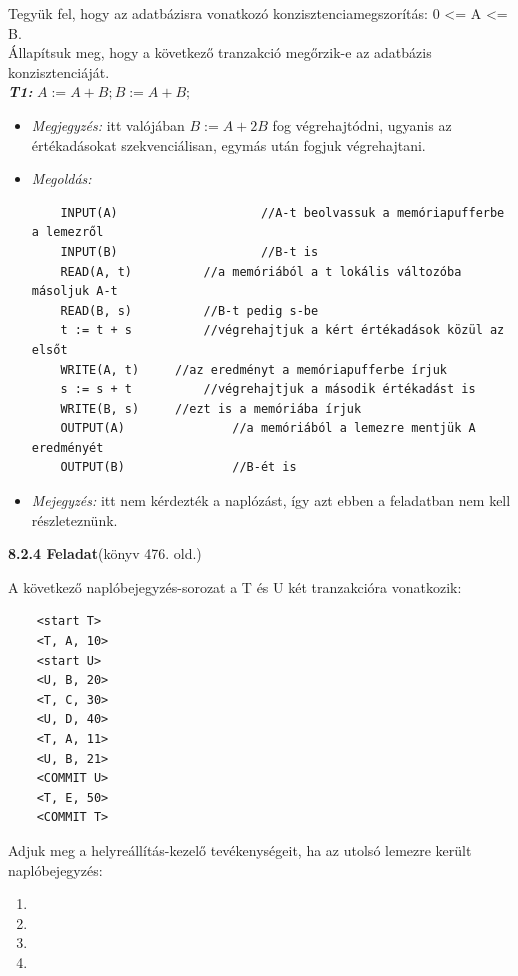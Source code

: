 \documentclass[a4paper,11.5pt, table]{article}
\begin{document}
	Tegyük fel, hogy az adatbázisra vonatkozó konzisztenciamegszorítás: 0 <= A <= B. \\
	Állapítsuk meg, hogy a következő tranzakció megőrzik-e az adatbázis konzisztenciáját.\\
	\textbf{\textit{T1:}} $ A := A + B; B := A + B;$
	\begin{itemize}
		\item \textit{Megjegyzés:} itt valójában $B := A + 2B$ fog végrehajtódni, ugyanis az értékadásokat szekvenciálisan, egymás után fogjuk végrehajtani. 
		
		\item \textit{Megoldás:}\\
		\begin{lstlisting}
	INPUT(A)					//A-t beolvassuk a memóriapufferbe a lemezről
	INPUT(B)					//B-t is
	READ(A, t)			//a memóriából a t lokális változóba másoljuk A-t
	READ(B, s)			//B-t pedig s-be
	t := t + s			//végrehajtjuk a kért értékadások közül az elsőt
	WRITE(A, t)		//az eredményt a memóriapufferbe írjuk 
	s := s + t			//végrehajtjuk a második értékadást is
	WRITE(B, s)		//ezt is a memóriába írjuk
	OUTPUT(A)				//a memóriából a lemezre mentjük A eredményét 
	OUTPUT(B)				//B-ét is
		\end{lstlisting}
		
		\item \textit{Mejegyzés:} itt nem kérdezték a naplózást, így azt ebben a feladatban nem kell részleteznünk.
	\end{itemize}

	\textbf{8.2.4 Feladat}(könyv 476. old.)
	
	A következő naplóbejegyzés-sorozat a T és U két tranzakcióra vonatkozik:
	\begin{lstlisting}
	<start T> 
	<T, A, 10> 
	<start U> 
	<U, B, 20> 
	<T, C, 30> 
	<U, D, 40>
	<T, A, 11>
	<U, B, 21>  
	<COMMIT U>
	<T, E, 50> 
	<COMMIT T>
	\end{lstlisting}
	Adjuk meg a helyreállítás-kezelő tevékenységeit, ha az utolsó lemezre került naplóbejegyzés:
	\begin{enumerate}[label=\alph*)]
		\item <start U> 
		\item <COMMIT U>
		\item <T, E, 50>
		\item <COMMIT T>
	\end{enumerate}
	
\end{document}
